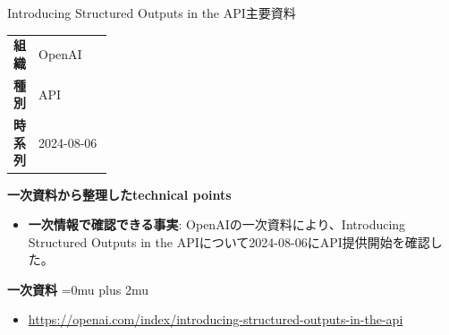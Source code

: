 \begin{technicalnote}{Introducing Structured Outputs in the API}{主要資料}
\begingroup
\begin{tabularx}{\linewidth}{@{}>{\bfseries}p{0.22\linewidth}X@{}}
組織 & OpenAI \\
種別 & API \\
時系列 & 2024-08-06 \\
\end{tabularx}
\smallskip
{\bfseries 一次資料から整理したtechnical points}
\begin{itemize}[leftmargin=1.5em,itemsep=0.35em]
\item \textbf{一次情報で確認できる事実}: OpenAIの一次資料により、Introducing Structured Outputs in the APIについて2024-08-06にAPI提供開始を確認した。
\end{itemize}
\begin{minipage}{\linewidth}
\begin{samepage}
{\bfseries 一次資料}
\begingroup\sloppy
\Urlmuskip=0mu plus 2mu\relax
\begin{itemize}[leftmargin=1.5em,itemsep=0.25em]
\item {\scriptsize\url{https://openai.com/index/introducing-structured-outputs-in-the-api}}
\end{itemize}
\endgroup
\end{samepage}
\end{minipage}
\endgroup
\end{technicalnote}
\medskip

